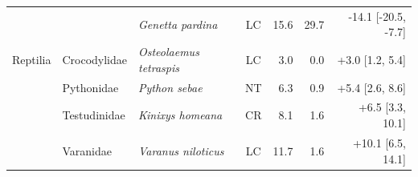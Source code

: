 \begin{tabular}{lllcrrr}
 &  & \textit{Genetta pardina} & LC & 15.6 & 29.7 & -14.1 [-20.5, -7.7] \\
Reptilia & Crocodylidae & \textit{Osteolaemus tetraspis} & LC & 3.0 & 0.0 & +3.0 [1.2, 5.4] \\
 & Pythonidae & \textit{Python sebae} & NT & 6.3 & 0.9 & +5.4 [2.6, 8.6] \\
 & Testudinidae & \textit{Kinixys homeana} & CR & 8.1 & 1.6 & +6.5 [3.3, 10.1] \\
 & Varanidae & \textit{Varanus niloticus} & LC & 11.7 & 1.6 & +10.1 [6.5, 14.1] \\
\bottomrule
\end{tabular}
